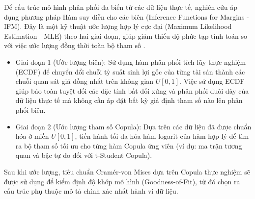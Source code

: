 Để cấu trúc mô hình phân phối đa biến từ các dữ liệu thực tế, nghiên cứu áp dụng phương pháp Hàm suy diễn cho các biên (Inference Functions for Margins - IFM). Đây là một kỹ thuật ước lượng hợp lý cực đại (Maximum Likelihood Estimation - MLE) theo hai giai đoạn, giúp giảm thiểu độ phức tạp tính toán so với việc ước lượng đồng thời toàn bộ tham số \cite{ruschendorf2009distributional}.
\begin{itemize}
    \item Giai đoạn 1 (Ước lượng biên): Sử dụng hàm phân phối tích lũy thực nghiệm (ECDF) để chuyển đổi chuỗi tỷ suất sinh lợi gốc của từng tài sản thành các chuỗi quan sát giả đồng nhất trên không gian $U[0,1]$. Việc sử dụng ECDF giúp bảo toàn tuyệt đối các đặc tính bất đối xứng và phân phối đuôi dày của dữ liệu thực tế mà không cần áp đặt bất kỳ giả định tham số nào lên phân phối biên.
    \item Giai đoạn 2 (Ước lượng tham số Copula): Dựa trên các dữ liệu đã được chuẩn hóa ở miền $U[0,1]$, tiến hành tối đa hóa hàm logarit của hàm hợp lý để tìm ra bộ tham số tối ưu cho từng hàm Copula ứng viên (ví dụ: ma trận tương quan và bậc tự do đối với t-Student Copula).
\end{itemize}
Sau khi ước lượng, tiêu chuẩn Cramér-von Mises dựa trên Copula thực nghiệm sẽ được sử dụng để kiểm định độ khớp mô hình (Goodness-of-Fit), từ đó chọn ra cấu trúc phụ thuộc mô tả chính xác nhất hành vi dữ liệu.